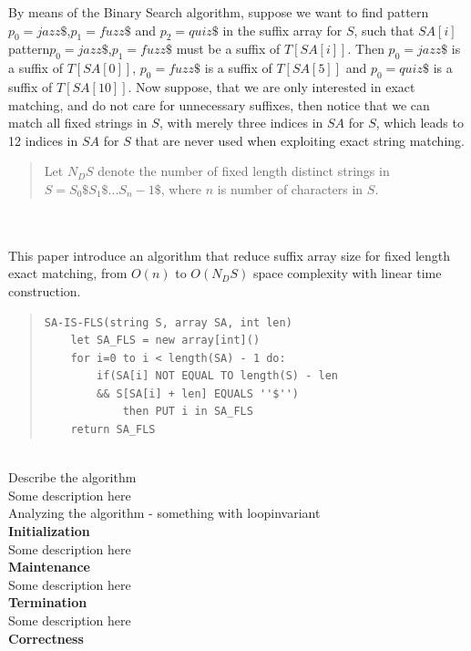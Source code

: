 \documentclass[12pt]{article} %
\begin{document}
By means of the Binary Search algorithm, suppose we want to find pattern $p_0=jazz\$$,$ p_1=fuzz\$$ and $p_2=quiz\$$ in the suffix array for $S$, such that $SA[i]$ pattern$ p_0=jazz\$$,$ p_1=fuzz\$$ must be a suffix of $T[SA[i]]$. Then $p_0=jazz\$$ is a suffix of $T[SA[0]]$, $p_0=fuzz\$$ is a suffix of $T[SA[5]]$ and $p_0=quiz\$$ is a suffix of $T[SA[10]]$. Now suppose, that we are only interested in exact matching, and do not care for unnecessary suffixes, then notice that we can match all fixed strings in $S$, with merely three indices in $SA$ for $S$, which leads to 12 indices in $SA$ for $S$ that are never used when exploiting exact string matching. 
\\
\begin{quote}
Let $N_DS$ denote the number of fixed length distinct strings in $S=S_0\$S_1\$...S_n-1\$ $, where $n$ is number of characters in $S$.
\end{quote}
\\ \\
This paper introduce an algorithm that reduce suffix array size for fixed length exact matching, from $O(n)$ to $O(N_DS)$ space complexity with linear time construction. 

\begin{quote}
\begin{lstlisting}
SA-IS-FLS(string S, array SA, int len)
	let SA_FLS = new array[int]()
	for i=0 to i < length(SA) - 1 do:
		if(SA[i] NOT EQUAL TO length(S) - len
		&& S[SA[i] + len] EQUALS ''$'') 
			then PUT i in SA_FLS
	return SA_FLS
\end{lstlisting}
\end{quote}
\\
Describe the algorithm
\\
Some description here
\\

Analyzing the algorithm - something with loopinvariant
\\ 
\textbf{Initialization}
\\
Some description here
\\

\textbf{Maintenance}
\\
Some description here
\\

\textbf{Termination}
\\
Some description here
\\

\textbf{Correctness}
\\
\end{document}
